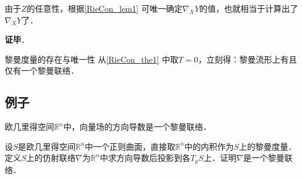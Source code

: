 由于$Z$的任意性，根据\autoref{RieCon_lem1} 可唯一确定$\nabla_XY$的值，也就相当于计算出了$\nabla_XY$了．

\textbf{证毕}．

\begin{corollary}{黎曼度量的存在与唯一性}\label{RieCon_cor1}
从\autoref{RieCon_the1} 中取$T=0$，立刻得：黎曼流形上有且仅有一个黎曼联络．
\end{corollary}

\subsection{例子}

\begin{example}{}
欧几里得空间$\mathbb{R}^n$中，向量场的方向导数是一个黎曼联络．
\end{example}


\begin{exercise}{}
设$S$是欧几里得空间$\mathbb{R}^n$中一个正则曲面，直接取$\mathbb{R}^n$中的内积作为$S$上的黎曼度量．定义$S$上的仿射联络$\nabla$为$\mathbb{R}^n$中求方向导数后投影到各$T_pS$上．证明$\nabla$是一个黎曼联络．
\end{exercise}






